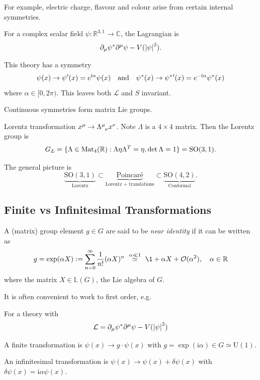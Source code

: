 \documentclass[a4paper,11pt]{article}
\begin{document}
	For example, electric charge, flavour and colour arise from certain internal symmetries.

	\begin{ex}
		For a complex scalar field $\psi : \mathbb{R}^{3,1}\to \mathbb{C}$, the Lagrangian is
		\[
			\partial_\mu \psi^* \partial^\mu \psi - V(\abs{\psi}^2).
		\]
		 
		This theory has a symmetry 
		\[
			\psi(x) \to \psi'(x) = e^{\mathrm{i}\alpha}\psi(x) \quad \text{and} \quad \psi^*(x) \to \psi^*\/'(x) = e^{-\mathrm{i}\alpha}\psi^*(x)
		\]
		where $\alpha \in [0,2\pi)$. This leaves both $\mathcal{L}$ and $S$ invariant.
	\end{ex}

	Continuous symmetries form matrix Lie groups.
	\begin{ex}
		Lorentz transformation $x^\mu \to \LT{\mu}{\nu} x^\nu$. Note $\Lambda$ is a $4 \times 4$ matrix. Then the Lorentz group is
		\[
			G_L = \{\Lambda \in \operatorname{Mat}_4(\mathbb{R}): \Lambda \eta \Lambda^T = \eta, \det \Lambda = 1\} = \mathrm{SO}(3,1).
		\]
		
		The general picture is
		\[
			\underbrace{\mathrm{SO}(3,1)}_{\text{Lorentz}} \subset \underbrace{\text{Poincar\'e}}_{\text{Lorentz + translations}} \subset \underbrace{\mathrm{SO}(4,2)}_{\text{Conformal}}.
		\]
	\end{ex}

	\subsection{Finite vs Infinitesimal Transformations}

	\begin{defi}
		A (matrix) group element $g \in G$ are said to be \emph{near identity} if it can be written as 
		\[
			g = \exp (\alpha X):= \sum_{n=0}^\infty \frac{1}{n!} (\alpha X)^n\ \stackrel{\alpha \ll 1}{\simeq}\ \1 + \alpha X + \mathcal{O}(\alpha^2), \quad \alpha \in \mathbb{R}
		\]
		where the matrix $X \in \mathbb{L}(G)$, the Lie algebra of $G$.  
	\end{defi}

	It is often convenient to work to first order, e.g.
	\begin{ex}
		For a theory with
		\[
			\mathcal{L} = \partial_\mu \psi^* \partial^\mu \psi - V(\abs{\psi}^2)
		\]

		A finite transformation is $\psi(x) \to g \cdot \psi(x)$ with $g = \exp(\mathrm{i} \alpha) \in G \simeq \mathrm{U}(1)$.
		
		An infinitesimal transformation is $ \psi(x) \to \psi(x) + \delta\psi (x)$ with $\delta \psi(x) = \mathrm{i} \alpha \psi(x)$.
		
	\end{ex}
\end{document}
